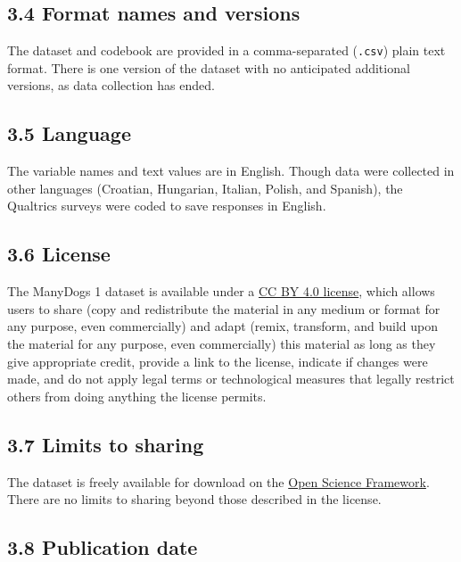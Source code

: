 \documentclass[
  man,floatsintext]{apa6}
\begin{document}
\hypertarget{format-names-and-versions}{%
\subsection{3.4 Format names and versions}\label{format-names-and-versions}}

The dataset and codebook are provided in a comma-separated (\texttt{.csv}) plain text format. There is one version of the dataset with no anticipated additional versions, as data collection has ended.

\hypertarget{language}{%
\subsection{3.5 Language}\label{language}}

The variable names and text values are in English. Though data were collected in other languages (Croatian, Hungarian, Italian, Polish, and Spanish), the Qualtrics surveys were coded to save responses in English.

\hypertarget{license}{%
\subsection{3.6 License}\label{license}}

The ManyDogs 1 dataset is available under a \href{https://creativecommons.org/licenses/by/4.0/}{CC BY 4.0 license}, which allows users to share (copy and redistribute the material in any medium or format for any purpose, even commercially) and adapt (remix, transform, and build upon the material for any purpose, even commercially) this material as long as they give appropriate credit, provide a link to the license, indicate if changes were made, and do not apply legal terms or technological measures that legally restrict others from doing anything the license permits.

\hypertarget{limits-to-sharing}{%
\subsection{3.7 Limits to sharing}\label{limits-to-sharing}}

The dataset is freely available for download on the \href{https://doi.org/10.17605/OSF.IO/7RWPC}{Open Science Framework}. There are no limits to sharing beyond those described in the license.

\hypertarget{publication-date}{%
\subsection{3.8 Publication date}\label{publication-date}}
\end{document}
